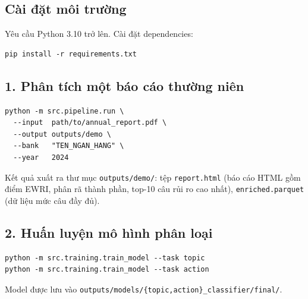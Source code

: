 \subsection*{Cài đặt môi trường}

Yêu cầu Python 3.10 trở lên. Cài đặt dependencies:

\begin{verbatim}
pip install -r requirements.txt
\end{verbatim}

\subsection*{1. Phân tích một báo cáo thường niên}

\begin{verbatim}
python -m src.pipeline.run \
  --input  path/to/annual_report.pdf \
  --output outputs/demo \
  --bank   "TEN_NGAN_HANG" \
  --year   2024
\end{verbatim}

Kết quả xuất ra thư mục \texttt{outputs/demo/}: tệp \texttt{report.html} (báo cáo HTML gồm điểm EWRI, phân rã thành phần, top-10 câu rủi ro cao nhất), \texttt{enriched.parquet} (dữ liệu mức câu đầy đủ).

\subsection*{2. Huấn luyện mô hình phân loại}

\begin{verbatim}
python -m src.training.train_model --task topic
python -m src.training.train_model --task action
\end{verbatim}

Model được lưu vào \texttt{outputs/models/\{topic,action\}\_classifier/final/}.

